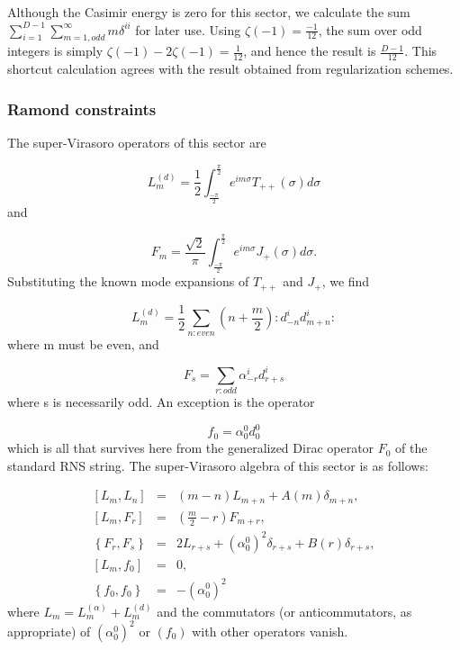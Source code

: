 \documentclass[a4paper,a4paper]{article}
\begin{document}
Although the Casimir energy is zero for this sector, we calculate
the sum $\sum_{i=1}^{D-1}\sum_{m=1,odd}^{\infty}m\delta^{ii}$ for
later use.  Using $\zeta(-1)=\frac{-1}{12}$, the sum over odd
integers is simply $\zeta(-1)-2\zeta(-1)=\frac{1}{12}$, and hence
the result is $\frac{D-1}{12}$.  This shortcut calculation agrees
with the result obtained from regularization schemes.

\subsubsection{Ramond constraints}

The super-Virasoro operators of this sector  are

\begin{equation}
L_{m}^{(d)}=\frac{1}{2}\int_{\frac{-\pi}{2}}^{\frac{\pi}{2}}e^{im\sigma}T_{++}(\sigma)d\sigma
\end{equation}
and

\begin{equation}
F_{m}=\frac{\sqrt{2}}{\pi}\int_{\frac{-\pi}{2}}^{\frac{\pi}{2}}e^{im\sigma}J_{+}(\sigma)d\sigma.
\end{equation}
Substituting the known mode expansions of $T_{++}$ and $J_{+}$, we
find

\begin{equation}
L_{m}^{(d)}=\frac{1}{2}\sum_{n:even}(n+\frac{m}{2}):d_{-n}^{i}d_{m+n}^{i}:
\end{equation}
where m must be even, and

\begin{equation}
F_{s}=\sum_{r:odd}\alpha_{-r}^{i}d_{r+s}^{i}
\end{equation}
where s is  necessarily odd.  An exception is the operator

\begin{equation}
f_{0}=\alpha_{0}^{0}d_{0}^{0}
\end{equation}
which is all that survives here from  the generalized Dirac
operator $F_0$ of the standard RNS string. The super-Virasoro algebra of
this sector is as follows:

\begin{eqnarray}
\left[L_{m},L_{n}\right]&=&(m-n)L_{m+n}+A(m)\delta_{m+n},\\
\left[L_{m},F_{r}\right]&=&(\frac{m}{2}-r)F_{m+r},\\
\left\{F_{r},F_{s}\right\}&=&2L_{r+s}+(\alpha^{0}_{0})^2
\delta_{r+s}+
B(r)\delta_{r+s},\\
\left[L_{m}, f_{0}\right]&=&0, \\
\left\{f_{0}, f_{0}\right\}&=&-(\alpha_{0}^{0})^{2}
\end{eqnarray}
where $L_{m}=L_{m}^{(\alpha)}+L_{m}^{(d)}$ and the commutators (or
anticommutators, as appropriate) of $(\alpha_{0}^{0})^{2}$ or
$(f_{0})$ with other operators vanish.
\end{document}
